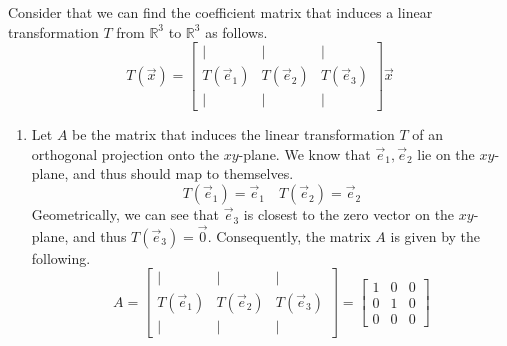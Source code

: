 \begin{SaveQuestion}
    Consider that we can find the coefficient matrix that induces a linear transformation $T$ from $\mathbb{R}^3$ to $\mathbb{R}^3$ as follows.
    $$T(\vec x) = \begin{bmatrix} \vert & \vert & \vert \\ T(\vec e_1) & T(\vec e_2) & T(\vec e_3) \\ \vert & \vert & \vert \end{bmatrix}\vec x$$
    \begin{enumerate}
        \item Let $A$ be the matrix that induces the linear transformation $T$ of an orthogonal projection onto the $xy$-plane. We know that $\vec e_1, \vec e_2$ lie on the $xy$-plane, and thus should map to themselves. 
        $$T(\vec e_1) = \vec e_1 \quad T(\vec e_2) = \vec e_2$$
        Geometrically, we can see that $\vec e_3$ is closest to the zero vector on the $xy$-plane, and thus $T(\vec e_3) = \vec 0$. 
        Consequently, the matrix $A$ is given by the following. 
        $$A = \begin{bmatrix} \vert & \vert & \vert \\ T(\vec e_1) & T(\vec e_2) & T(\vec e_3) \\ \vert & \vert & \vert \end{bmatrix} = \begin{bmatrix} 1 & 0 & 0 \\ 0 & 1 & 0 \\ 0 & 0 & 0 \end{bmatrix}$$


\end{enumerate}
\end{SaveQuestion}
